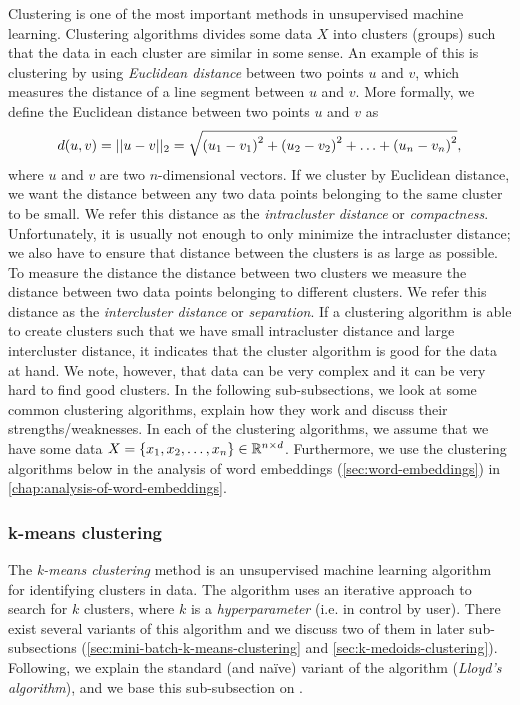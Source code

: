 Clustering is one of the most important methods in unsupervised machine learning. Clustering algorithms divides some data $X$ into clusters (groups) such that the data in each cluster are similar in some sense. An example of this is clustering by using \textit{Euclidean distance} between two points $u$ and $v$, which measures the distance of a line segment between $u$ and $v$. More formally, we define the Euclidean distance between two points $u$ and $v$ as
\begin{align}
    d(u, v) = ||u-v||_2 = \sqrt{\left(u_1 - v_1\right)^2 + \left(u_2 - v_2\right)^2 + \ldots + \left(u_n - v_n\right)^2},
    \label{eqn:euclidean-distance}
\end{align}
where $u$ and $v$ are two $n$-dimensional vectors. If we cluster by Euclidean distance, we want the distance between any two data points belonging to the same cluster to be small. We refer this distance as the \textit{intracluster distance} or \textit{compactness}. Unfortunately, it is usually not enough to only minimize the intracluster distance; we also have to ensure that distance between the clusters is as large as possible. To measure the distance the distance between two clusters we measure the distance between two data points belonging to different clusters. We refer this distance as the \textit{intercluster distance} or \textit{separation}. If a clustering algorithm is able to create clusters such that we have small intracluster distance and large intercluster distance, it indicates that the cluster algorithm is good for the data at hand. We note, however, that data can be very complex and it can be very hard to find good clusters. In the following sub-subsections, we look at some common clustering algorithms, explain how they work and discuss their strengths/weaknesses. In each of the clustering algorithms, we assume that we have some data $X = \left\{x_1, x_2, \ldots, x_n\right\} \in \mathbb{R}^{n \times d}$. Furthermore, we use the clustering algorithms below in the analysis of word embeddings (\cref{sec:word-embeddings}) in \cref{chap:analysis-of-word-embeddings}.

\subsubsection{k-means clustering}
\label{sec:k-means-clustering}
The \textit{k-means clustering} method \cite[Section 9.1]{bishop2006} is an unsupervised machine learning algorithm for identifying clusters in data. The algorithm uses an iterative approach to search for $k$ clusters, where $k$ is a \textit{hyperparameter} (i.e. in control by user). There exist several variants of this algorithm and we discuss two of them in later sub-subsections (\cref{sec:mini-batch-k-means-clustering} and \cref{sec:k-medoids-clustering}). Following, we explain the standard (and naïve) variant of the algorithm (\textit{Lloyd's algorithm}), and we base this sub-subsection on \cite[Section 9.1]{bishop2006}.

